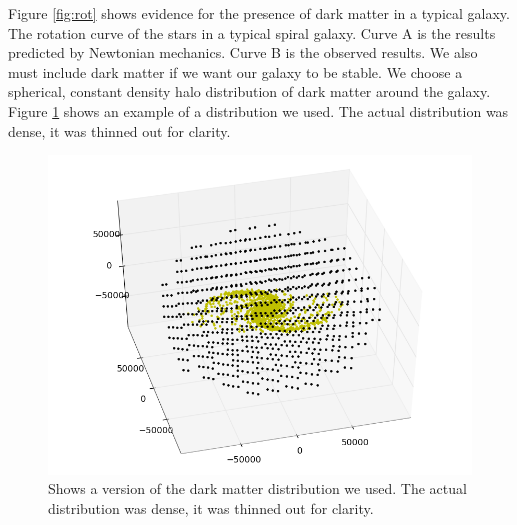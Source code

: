 \documentclass{report}
\begin{document}
Figure \ref{fig:rot} shows evidence for the presence of dark matter in a typical galaxy. The rotation curve of the stars in a typical spiral galaxy. Curve A is the results predicted by
 Newtonian mechanics. Curve B is the observed results. We also must include dark matter if we want our galaxy to be stable. We choose a spherical, constant density halo distribution of dark matter around the galaxy. Figure \ref{fig:dark} shows an example of a distribution we used. The actual distribution was dense, it was thinned out for clarity.

\begin{figure}[H]
 \centering
 \includegraphics[width=\textwidth]{./darkmatterdist.png}
  \caption{Shows a version of the dark matter distribution we used. The actual distribution was dense, it was thinned out for clarity. } 
 \label{fig:dark}
\end{figure}



 
\end{document}
